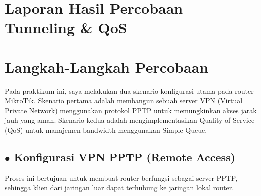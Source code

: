 \section*{Laporan Hasil Percobaan Tunneling \& QoS}

\section{Langkah-Langkah Percobaan}
Pada praktikum ini, saya melakukan dua skenario konfigurasi utama pada router MikroTik. Skenario pertama adalah membangun sebuah server VPN (Virtual Private Network) menggunakan protokol PPTP untuk memungkinkan akses jarak jauh yang aman. Skenario kedua adalah mengimplementasikan Quality of Service (QoS) untuk manajemen bandwidth menggunakan Simple Queue.

\subsection*{$\bullet$ Konfigurasi VPN PPTP (Remote Access)}
Proses ini bertujuan untuk membuat router berfungsi sebagai server PPTP, sehingga klien dari jaringan luar dapat terhubung ke jaringan lokal router.

